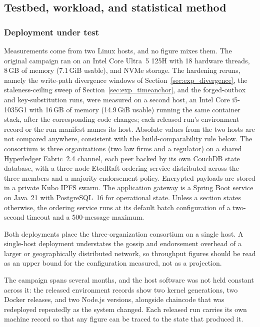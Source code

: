 \documentclass[preprint,12pt]{elsarticle}
\begin{document}
\subsection{Testbed, workload, and statistical method}
\label{sec:testbed}

\subsubsection*{Deployment under test}

Measurements come from two Linux hosts, and no figure mixes them. The
original campaign ran on an Intel Core Ultra~5 125H with 18 hardware threads,
8\,GB of memory (7.1\,GiB usable), and NVMe storage. The hardening reruns,
namely the write-path divergence windows of Section~\ref{sec:exp_divergence},
the staleness-ceiling sweep of Section~\ref{sec:exp_timeanchor}, and the
forged-outbox and key-substitution runs, were measured on a second host, an
Intel Core i5-1035G1 with 16\,GB of memory (14.9\,GiB usable) running the
same container stack,
after the corresponding code changes; each released run's environment record
or the run manifest names its host. Absolute values from the two hosts are not compared anywhere,
consistent with the build-comparability rule below. The consortium is three organizations (two law firms and a
regulator) on a shared Hyperledger Fabric~2.4 channel, each peer backed by its own
CouchDB state database, with a three-node EtcdRaft ordering service distributed
across the three members and a majority endorsement policy. Encrypted payloads
are stored in a private Kubo IPFS swarm. The application gateway is a Spring
Boot service on Java~21 with PostgreSQL~16 for operational state. Unless a
section states otherwise, the ordering service runs at its default batch
configuration of a two-second timeout and a 500-message maximum.

Both deployments place the three-organization consortium on a single host.
A single-host deployment understates the gossip and endorsement overhead of a
larger or geographically distributed network, so throughput figures should be
read as an upper bound for the configuration measured, not as a projection.

The campaign spans several months, and the host software was not held constant across it:
the released environment records show two kernel generations, two Docker
releases, and two Node.js versions, alongside chaincode that was redeployed
repeatedly as the system changed. Each released run carries its own machine
record so that any figure can be traced to the state that produced it.
\end{document}
